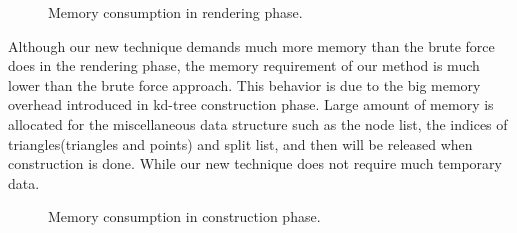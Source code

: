 \begin{figure}[ftp]
    \centering
    \renewcommand{\thefigure}{\thechapter.\arabic{figure}}
    \caption[Memory consumption in rendering phase]{Memory consumption in rendering phase.}
    \label{fig:memory_consumption}
\end{figure}

Although our new technique demands much more memory than the brute force does in the rendering phase, the memory requirement of our method is much lower than the brute force approach. This behavior is due to the big memory overhead introduced in kd-tree construction phase. Large amount of memory is allocated for the miscellaneous data structure such as the node list, the indices of triangles(triangles and points) and split list, and then will be released when construction is done. While our new technique does not require much temporary data.

\begin{figure}[ftp]
    \centering
    \renewcommand{\thefigure}{\thechapter.\arabic{figure}}
    \caption[Memory consumption in construction phase]{Memory consumption in construction phase. }
    \label{fig:memory_consumption_2}
\end{figure}

